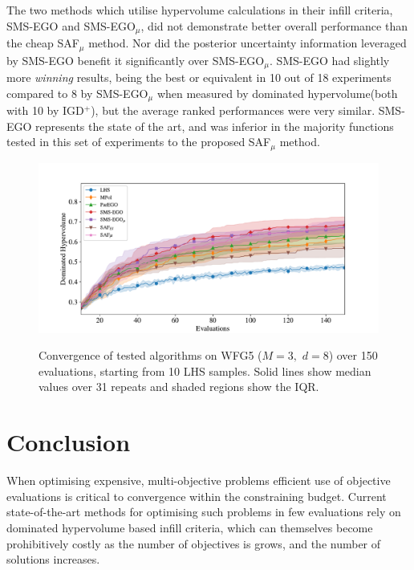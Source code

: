 \documentclass[conference]{IEEEtran}
\newcommand{\ndim}{d}
\newcommand{\nobj}{M}
\newcommand\hpv{dominated hypervolume\xspace}
\newcommand\safmu{SAF$_{\mu}$\xspace}
\newcommand\smsego{SMS-EGO\xspace}
\newcommand\smsegomu{SMS-EGO$_{\mu}$\xspace}
\newcommand\igd{IGD$^+$\xspace}
\begin{document}
The two methods which utilise hypervolume calculations in their infill criteria, \smsego and \smsegomu, did not demonstrate better overall performance than the cheap \safmu method. Nor did the posterior uncertainty information leveraged by \smsego benefit it significantly over \smsegomu. \smsego had slightly more \textit{winning} results, being the best or equivalent in 10 out of 18 experiments compared to 8 by \smsegomu when measured by \hpv (both with 10 by \igd), but the average ranked performances were very similar. \smsego represents the state of the art, and was inferior in the majority functions tested in this set of experiments to the proposed \safmu method. 

\begin{figure}[t]
         \centering
         \includegraphics[width=\columnwidth, 
         trim= 16mm 0mm 22mm 15mm, clip]{figures/wfg5_3obj_8dim_hv_plot.pdf}
         \label{fig: exemplar_pf_sms_saf_hv}
\caption{Convergence of tested algorithms on WFG5 ($\nobj = 3,$ $\ndim = 8$) over 150 evaluations, starting from 10 LHS samples. Solid lines show median values over 31 repeats and shaded regions show the IQR.}
\label{fig: exemplar_pf}
\end{figure}


\section{Conclusion}\label{sec:conclusion}
When optimising expensive, multi-objective problems efficient use of objective evaluations is critical to convergence within the constraining budget. Current state-of-the-art methods for optimising such problems in few evaluations rely on \hpv based infill criteria, which can themselves become prohibitively costly as the number of objectives is grows, and the number of solutions increases. 
\end{document}

